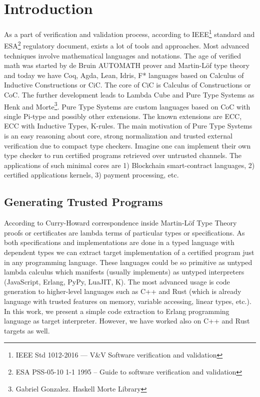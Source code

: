 \documentclass{aip-cp}
\begin{document}
\section{Introduction}
As a part of verification and validation process, according to IEEE\footnote{IEEE Std 1012-2016  --- V\&V Software verification and validation} standard
and ESA\footnote{ESA PSS-05-10 1-1 1995 -- Guide to software verification and validation} regulatory document,
exists a lot of tools and approaches. Most advanced techniques
involve mathematical languages and notations. The age of verified math was
started by de Bruin AUTOMATH prover and Martin-Löf\cite{Lof84} type theory and today we have Coq, Agda, Lean, Idris, F* languages
based on Calculus of Inductive Constructions or CiC\cite{Mohring15}.
The core of CiC is Calculus of Constructions or CoC\cite{Coq88}.
The further development leads to Lambda Cube\cite{Henk93} and Pure Type Systems as Henk\cite{Erik97} and Morte\footnote{Gabriel Gonzalez. Haskell Morte Library}.
Pure Type Systems are custom languages based on CoC with single Pi-type and possibly other extensions.
The known extensions are ECC, ECC with Inductive Types\cite{Ore92}, K-rules\cite{Barthe95}.
The main motivation of Pure Type Systems is an easy reasoning about core,
strong normalization and trusted external verification due to compact type checkers.
Imagine one can implement their own type checker to run certified
programs retrieved over untrusted channels. The applications of
such minimal cores are 1) Blockchain smart-contract languages,
2) certified applications kernels, 3) payment processing, etc.

\subsection{Generating Trusted Programs}
According to Curry-Howard correspondence inside Martin-Löf Type Theory\cite{Lof84}
proofs or certificates are lambda terms of particular types or specifications.
As both specifications and implementations are done in a typed
language with dependent types we can extract target implementation of a certified program just
in any programming language. These languages could be so
primitive as untyped lambda calculus which manifests (usually implements) as
untyped interpreters (JavaScript, Erlang, PyPy, LuaJIT, K).
The most advanced usage is code generation to higher-level
languages such as C++ and Rust (which is already language with trusted
features on memory, variable accessing, linear types, etc.). In this work, we present a
simple code extraction to Erlang programming language as target interpreter.
However, we have worked also on C++ and Rust targets as well.
\end{document}
